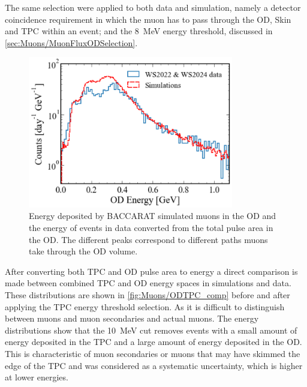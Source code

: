 The same selection were applied to both data and simulation, namely a detector coincidence requirement in which the muon has to pass through the OD, Skin and TPC within an event; and the 8~MeV energy threshold, discussed in \autoref{sec:Muons/MuonFluxODSelection}.

\begin{figure}[ht!]
    \centering
    \includegraphics[width=0.8\textwidth]{figures/Muons/OD_comparison.pdf}
    \caption{Energy deposited by BACCARAT simulated muons in the OD and the energy of events in data converted from the total pulse area in the OD. The different peaks correspond to different paths muons take through the OD volume.}
    \label{fig:Muons/OD_comp}
\end{figure}
After converting both TPC and OD pulse area to energy a direct comparison is made between combined TPC and OD energy spaces in simulations and data. These distributions are shown in \autoref{fig:Muons/ODTPC_comp} before and after applying the TPC energy threshold selection.
As it is difficult to distinguish between muons and muon secondaries and actual muons. The energy distributions show that the 10~MeV cut removes events with a small amount of energy deposited in the TPC and a large amount of energy deposited in the OD. This is characteristic of muon secondaries or muons that may have skimmed the edge of the TPC and was considered as a systematic uncertainty, which is higher at lower energies.
